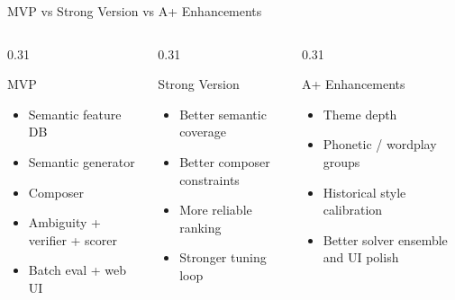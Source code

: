 \documentclass[11pt,aspectratio=169]{beamer}
\begin{document}
\begin{frame}{MVP vs Strong Version vs A+ Enhancements}
  \begin{columns}[T,onlytextwidth]
    \begin{column}{0.31\textwidth}
      \begin{block}{MVP}
        \begin{itemize}
          \item Semantic feature DB
          \item Semantic generator
          \item Composer
          \item Ambiguity + verifier + scorer
          \item Batch eval + web UI
        \end{itemize}
      \end{block}
    \end{column}
    \begin{column}{0.31\textwidth}
      \begin{exampleblock}{Strong Version}
        \begin{itemize}
          \item Better semantic coverage
          \item Better composer constraints
          \item More reliable ranking
          \item Stronger tuning loop
        \end{itemize}
      \end{exampleblock}
    \end{column}
    \begin{column}{0.31\textwidth}
      \begin{alertblock}{A+ Enhancements}
        \begin{itemize}
          \item Theme depth
          \item Phonetic / wordplay groups
          \item Historical style calibration
          \item Better solver ensemble and UI polish
        \end{itemize}
      \end{alertblock}
    \end{column}
  \end{columns}
\end{frame}
\end{document}
